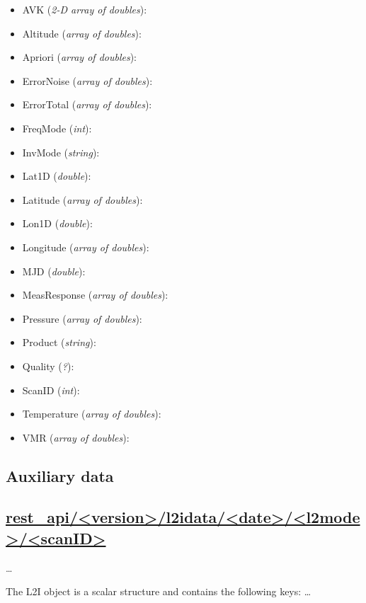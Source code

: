 \begin{itemize}

    \item AVK (\emph{2-D array of doubles}):
    \item Altitude (\emph{array of doubles}):
    \item Apriori (\emph{array of doubles}):
    \item ErrorNoise (\emph{array of doubles}):
    \item ErrorTotal (\emph{array of doubles}):
    \item FreqMode (\emph{int}):
    \item InvMode (\emph{string}):
    \item Lat1D (\emph{double}):
    \item Latitude  (\emph{array of doubles}):
    \item Lon1D (\emph{double}):
    \item Longitude  (\emph{array of doubles}):
    \item MJD (\emph{double}):
    \item MeasResponse (\emph{array of doubles}):
    \item Pressure (\emph{array of doubles}):
    \item Product (\emph{string}):
    \item Quality (\emph{?}):
    \item ScanID (\emph{int}):
    \item Temperature (\emph{array of doubles}):
    \item VMR (\emph{array of doubles}):

\end{itemize}

\subsection{Auxiliary data}
\subsection*{\url{rest_api/<version>/l2idata/<date>/<l2mode>/<scanID>}}
\dots{}\

The L2I object is a scalar structure and contains the following keys:
\dots{}\

